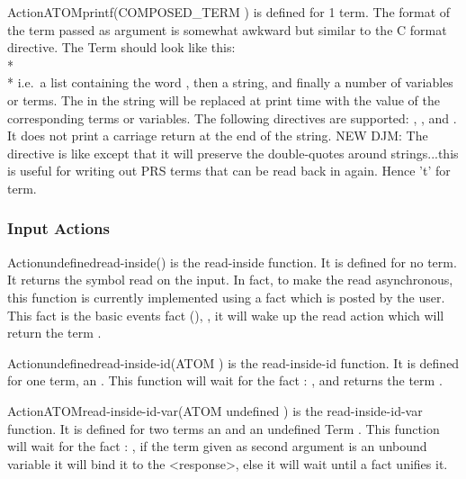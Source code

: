 \begin{typeefa}{Action}{ATOM}{printf}{(COMPOSED\_TERM )}
is defined for 1 term. The format of the term passed as argument is somewhat
awkward but similar to the C format directive. 
The Term should look like this: \\*
\\*
i.e.\ a list containing the word , then a string, and finally a
number of variables or terms.  The  in the string will be replaced at
print time with the value of the corresponding terms or variables. The
following directives are supported: , ,  and
. 
It does not print a carriage return at the end of the string.
NEW DJM: The directive  is like 
 except that it will preserve the double-quotes around strings...this is useful
for writing out PRS terms that can be read back in again.  Hence 't' for term.
\end{typeefa}

\subsubsection{Input Actions}

\begin{typeefa}{Action}{undefined}{read-inside}{()}
is the read-inside function. It is defined for no term. It returns the
symbol read on the input. In fact, to make the read asynchronous, this
function is currently implemented using a fact which is posted by the
user.  This fact is the basic events fact (),
, it will wake up the read action which
will return the term .
\end{typeefa}

\begin{typeefa}{Action}{undefined}{read-inside-id}{(ATOM )}
is the read-inside-id function. It is defined for one term, an . This
function will wait for the fact : , and
returns the term .
\end{typeefa}

\begin{typeefa}{Action}{ATOM}{read-inside-id-var}{(ATOM  undefined )}
is the read-inside-id-var function. It is defined for two
terms an   and an undefined Term .  This
function will wait for the fact : , if
the term  given as second argument is an unbound variable it
will bind it to the <response>, else it will wait until a fact unifies it.
\end{typeefa}

